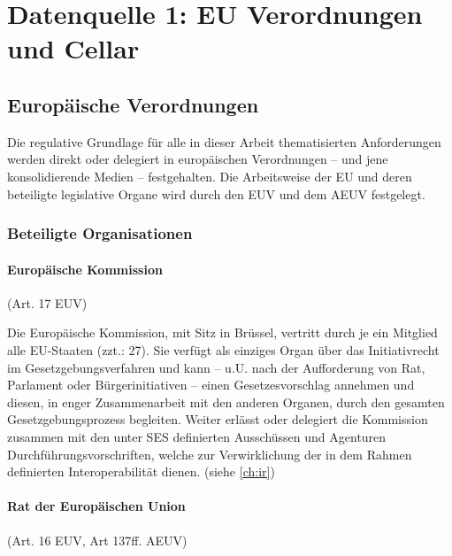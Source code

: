 \chapter{Datenquelle 1: EU Verordnungen und Cellar}
\section{Europäische Verordnungen}

    Die regulative Grundlage für alle in dieser Arbeit thematisierten Anforderungen werden direkt oder delegiert in europäischen Verordnungen -- und jene konsolidierende Medien -- festgehalten.
    Die Arbeitsweise der EU und deren beteiligte legislative Organe wird durch den \acf{EUV} und dem \acf{AEUV} festgelegt.
        
\subsection{Beteiligte Organisationen}
\subsubsection{Europäische Kommission}

    \begin{center}
        {\footnotesize(Art. 17 \ac{EUV})}
    \end{center}
    
    \noindent
    Die Europäische Kommission, mit Sitz in Brüssel, vertritt durch je ein Mitglied alle EU-Staaten (zzt.: 27). 
    Sie verfügt als einziges Organ über das Initiativrecht im Gesetzgebungsverfahren und kann – u.U. nach der Aufforderung von Rat, Parlament oder Bürgerinitiativen – einen Gesetzesvorschlag annehmen und diesen, in enger Zusammenarbeit mit den anderen Organen, durch den gesamten Gesetzgebungsprozess begleiten.
    \cite[Art. 17]{EUV}
    Weiter erlässt oder delegiert die Kommission zusammen mit den unter \ac{SES} definierten Ausschüssen und Agenturen Durchführungsvorschriften, welche zur Verwirklichung der in dem Rahmen definierten Interoperabilität dienen. (siehe \ref{ch:ir})
    
\subsubsection{Rat der Europäischen Union}

    \begin{center}
        {\footnotesize(Art. 16 \ac{EUV}, Art 137ff. \ac{AEUV})}
    \end{center}
    
